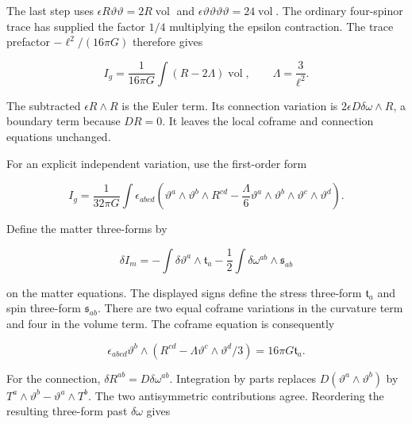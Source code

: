\documentclass[aps,prx,onecolumn,10pt,notitlepage,nofootinbib,longbibliography]{revtex4-2}
\numberwithin{equation}{section}
\numberwithin{table}{section}
\begin{document}
The last step uses \(\epsilon R\vartheta\vartheta=2R\operatorname{vol}\) and \(\epsilon\vartheta\vartheta\vartheta\vartheta=24\operatorname{vol}\). The ordinary four-spinor trace has supplied the factor \(1/4\) multiplying the epsilon contraction. The trace prefactor \(-\ell^2/(16\pi G)\) therefore gives

\begin{equation}
 I_g=\frac1{16\pi G}\int(R-2\Lambda)\operatorname{vol},
 \qquad \Lambda=\frac3{\ell^2}.
 \label{eq:proof-SE-4}
\end{equation}

The subtracted \(\epsilon R\wedge R\) is the Euler term. Its connection variation is \(2\epsilon D\delta\omega\wedge R\), a boundary term because \(DR=0\). It leaves the local coframe and connection equations unchanged.

For an explicit independent variation, use the first-order form

\begin{equation}
 I_g=\frac1{32\pi G}\int\epsilon_{abcd}
       \left(\vartheta^a\wedge \vartheta^b\wedge R^{cd}
             -\frac\Lambda6\vartheta^a\wedge \vartheta^b\wedge \vartheta^c\wedge \vartheta^d\right).
 \label{eq:proof-SE-5}
\end{equation}

Define the matter three-forms by

\begin{equation}
 \delta I_m=-\int\delta \vartheta^a\wedge\mathfrak t_a
             -\frac12\int\delta\omega^{ab}\wedge\mathfrak s_{ab}
\end{equation}

on the matter equations. The displayed signs define the stress three-form \(\mathfrak t_a\) and spin three-form \(\mathfrak s_{ab}\). There are two equal coframe variations in the curvature term and four in the volume term. The coframe equation is consequently

\begin{equation}
 \epsilon_{abcd}\vartheta^b\wedge
       (R^{cd}-\Lambda \vartheta^c\wedge \vartheta^d/3)=16\pi G\mathfrak t_a.
 \label{eq:proof-SE-6}
\end{equation}

For the connection, \(\delta R^{ab}=D\delta\omega^{ab}\). Integration by parts replaces \(D(\vartheta^a\wedge \vartheta^b)\) by \(T^a\wedge \vartheta^b-\vartheta^a\wedge T^b\). The two antisymmetric contributions agree. Reordering the resulting three-form past \(\delta\omega\) gives
\end{document}
